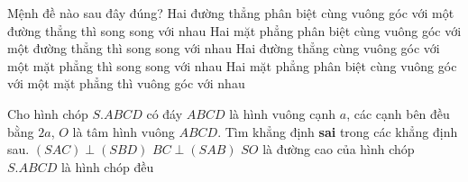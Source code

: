 \begin{ex}%
	Mệnh đề nào sau đây đúng?
	\choice
	{Hai đường thẳng phân biệt cùng vuông góc với một đường thẳng thì song song với nhau}
	{\True Hai mặt phẳng phân biệt cùng vuông góc với một đường thẳng thì song song với nhau}
	{ Hai đường thẳng cùng vuông góc với một mặt phẳng thì song song với nhau}
	{Hai mặt phẳng phân biệt cùng vuông góc với một mặt phẳng thì vuông góc với nhau}
	\loigiai{
		
	} 
\end{ex}
\begin{ex}%
	Cho hình chóp $S.ABCD$ có đáy $ABCD$ là hình vuông cạnh $a$, các cạnh bên đều bằng $2a$, $O$ là tâm hình vuông $ABCD$. Tìm khẳng định {\bf sai} trong các khẳng định sau.
	\choice
	{$(SAC) \perp (SBD)$}
	{\True $BC \perp (SAB)$}
	{ $SO$ là đường cao của hình chóp}
	{$S.ABCD$ là hình chóp đều}
\end{ex}
